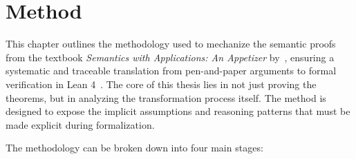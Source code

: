 

%
%
%
%
%
%
\chapter{Method}

This chapter outlines the methodology used to mechanize the semantic proofs
from the textbook \emph{Semantics with Applications: An Appetizer} by~\cite{nielson_semantics_2007}, ensuring a systematic and traceable translation from
pen-and-paper arguments to formal verification in Lean 4~\citep{theorem_proving_2026}.
The core of this
thesis lies in not just proving the theorems, but in analyzing the transformation
process itself. The method is designed to expose the implicit assumptions and
reasoning patterns that must be made explicit during formalization.

The methodology can be broken down into four main stages:

